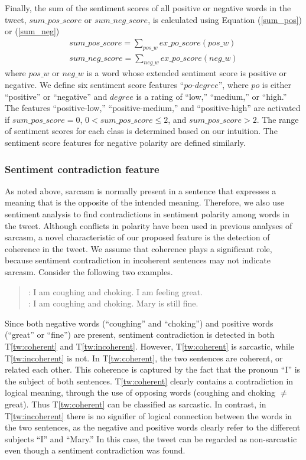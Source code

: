 \documentclass[english]{jnlp_1.4}
\def\extweet#1{}
\begin{document}
Finally, the sum of the sentiment scores of all positive or negative words in the tweet, $sum\_pos\_score$ or $sum\_neg\_score$, is calculated using Equation (\ref{sum_pos}) or (\ref{sum_neg})
\begin{gather}
    sum\_pos\_score = \sum\limits_{pos\_w}ex\_po\_score(pos\_w)
    \label{sum_pos} \\
    sum\_neg\_score = \sum\limits_{neg\_w}ex\_po\_score(neg\_w)
    \label{sum_neg}
\end{gather}
where $pos\_w$ or $neg\_w$ is a word whose extended sentiment score is positive or negative.
We define six sentiment score features ``$po$-$degree$'', where $po$ is either ``positive'' or ``negative'' and
$degree$ is a rating of ``low,'' ``medium,'' or ``high.''
The features ``positive-low,'' ``positive-medium,'' and ``positive-high'' are activated if $sum\_pos\_score = 0$, $0 < sum\_pos\_score \le 2$, and $sum\_pos\_score > 2$.
The range of sentiment scores for each class is determined based on our intuition.
The sentiment score features for negative polarity are defined similarly.


\subsubsection{Sentiment contradiction feature}
\label{sentiment_contradiction}

As noted above, sarcasm is normally present in a sentence that expresses a meaning that is the opposite of the intended meaning.
Therefore, we also use sentiment analysis to find contradictions in sentiment polarity among words in the tweet.
Although conflicts in polarity have been used in previous analyses of sarcasm, a novel characteristic of our proposed feature is the detection of coherence in the tweet.
We assume that coherence plays a significant role, because sentiment contradiction in incoherent sentences may not indicate sarcasm.
Consider the following two examples.
\begin{quote}
  \extweet{tw:coherent}: I am coughing and choking. I am feeling great.\\
  \extweet{tw:incoherent}: I am coughing and choking. Mary is still fine.
\end{quote}
Since both negative words (``coughing'' and ``choking'') and positive words (``great'' or ``fine'') are present, sentiment contradiction is detected in both T\ref{tw:coherent} and T\ref{tw:incoherent}. However, T\ref{tw:coherent} is sarcastic, while T\ref{tw:incoherent} is not.
In T\ref{tw:coherent}, the two sentences are coherent, or related each other.
This coherence is captured by the fact that the pronoun ``I'' is the subject of both sentences.
T\ref{tw:coherent} clearly contains a contradiction in logical meaning, through the use of opposing words (coughing and choking $\ne$ great).
Thus T\ref{tw:coherent} can be classified as sarcastic.
In contrast, in T\ref{tw:incoherent} there is no signifier of logical connection between the words in the two sentences, as the negative and positive words clearly refer to the different subjects ``I'' and ``Mary.''
In this case, the tweet can be regarded as non-sarcastic even though a sentiment contradiction was found.
\end{document}
